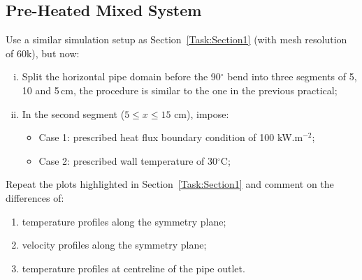 \documentclass[12pts,a4paper,amsmath,amssymb,floatfix]{article}%
\renewcommand\le{\leqslant}
\begin{document}
\subsection{Pre-Heated Mixed System}
Use a similar simulation setup as Section~\ref{Task:Section1} (with mesh resolution of 60k), but now:
    \begin{enumerate}[i)]
       \item Split the horizontal pipe domain before the 90$^{\circ}$ bend into three segments of 5, 10 and 5\,cm, the procedure is similar to the one in the previous practical;
       \item In the second segment ($5\le x \le 15$ cm), impose:
       \begin{itemize}
          \item Case 1: prescribed heat flux boundary condition of 100 kW.m$^{-2}$;
          \item Case 2: prescribed wall temperature of 30$^{\circ}$C;
        \end{itemize}
    \end{enumerate}
    
    \begin{shaded}    
    Repeat the plots highlighted in Section~\ref{Task:Section1} and comment on the differences of:
    \begin{enumerate}
      \item temperature profiles along the symmetry plane;
      \item velocity profiles along the symmetry plane;
      \item temperature profiles at centreline of the pipe outlet.
    \end{enumerate}
    \end{shaded}
    
\end{document}
